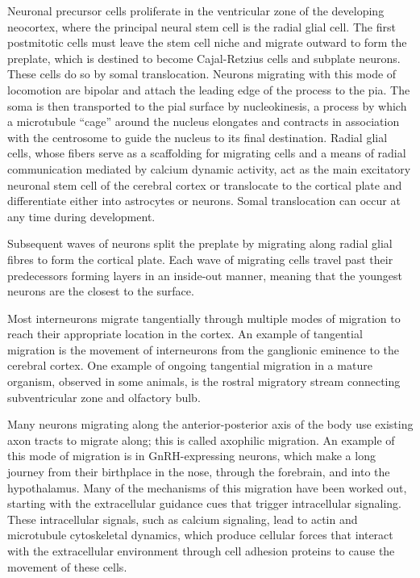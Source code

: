 \documentclass[]{book}
\begin{document}
Neuronal precursor cells proliferate in the ventricular zone of the developing neocortex, where the principal neural stem cell is the radial glial cell. The first postmitotic cells must leave the stem cell niche and migrate outward to form the preplate, which is destined to become Cajal-Retzius cells and subplate neurons. These cells do so by somal translocation. Neurons migrating with this mode of locomotion are bipolar and attach the leading edge of the process to the pia. The soma is then transported to the pial surface by nucleokinesis, a process by which a microtubule ``cage'' around the nucleus elongates and contracts in association with the centrosome to guide the nucleus to its final destination. Radial glial cells, whose fibers serve as a scaffolding for migrating cells and a means of radial communication mediated by calcium dynamic activity, act as the main excitatory neuronal stem cell of the cerebral cortex or translocate to the cortical plate and differentiate either into astrocytes or neurons. Somal translocation can occur at any time during development.

Subsequent waves of neurons split the preplate by migrating along radial glial fibres to form the cortical plate. Each wave of migrating cells travel past their predecessors forming layers in an inside-out manner, meaning that the youngest neurons are the closest to the surface.

Most interneurons migrate tangentially through multiple modes of migration to reach their appropriate location in the cortex. An example of tangential migration is the movement of interneurons from the ganglionic eminence to the cerebral cortex. One example of ongoing tangential migration in a mature organism, observed in some animals, is the rostral migratory stream connecting subventricular zone and olfactory bulb.

Many neurons migrating along the anterior-posterior axis of the body use existing axon tracts to migrate along; this is called axophilic migration. An example of this mode of migration is in GnRH-expressing neurons, which make a long journey from their birthplace in the nose, through the forebrain, and into the hypothalamus. Many of the mechanisms of this migration have been worked out, starting with the extracellular guidance cues that trigger intracellular signaling. These intracellular signals, such as calcium signaling, lead to actin and microtubule cytoskeletal dynamics, which produce cellular forces that interact with the extracellular environment through cell adhesion proteins to cause the movement of these cells.
\end{document}
